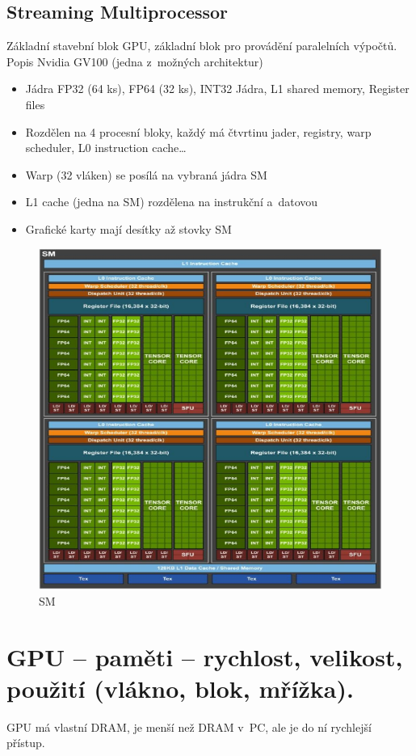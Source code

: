 \subsection{Streaming Multiprocessor}
Základní stavební blok GPU, základní blok pro provádění paralelních výpočtů. 
Popis Nvidia GV100 (jedna z~možných architektur)
\begin{itemize}
    \item Jádra FP32 (64 ks), FP64 (32 ks), INT32 Jádra, L1 shared memory, Register files
    \item Rozdělen na 4 procesní bloky, každý má čtvrtinu jader, registry, warp scheduler, L0 instruction cache\dots
    \item Warp (32 vláken) se posílá na vybraná jádra SM
    \item L1 cache (jedna na SM) rozdělena na instrukční a~datovou
    \item Grafické karty mají desítky až stovky SM
\end{itemize}

\begin{figure}[ht]
    \centering
    \includegraphics[width=0.7\linewidth]{MPC-PZP/pict/SM.png}
    \caption{SM}
    \label{fig:SM}
\end{figure}

\section{GPU – paměti – rychlost, velikost, použití (vlákno, blok, mřížka).}
GPU má vlastní DRAM, je menší než DRAM v~PC, ale je do ní rychlejší přístup.

